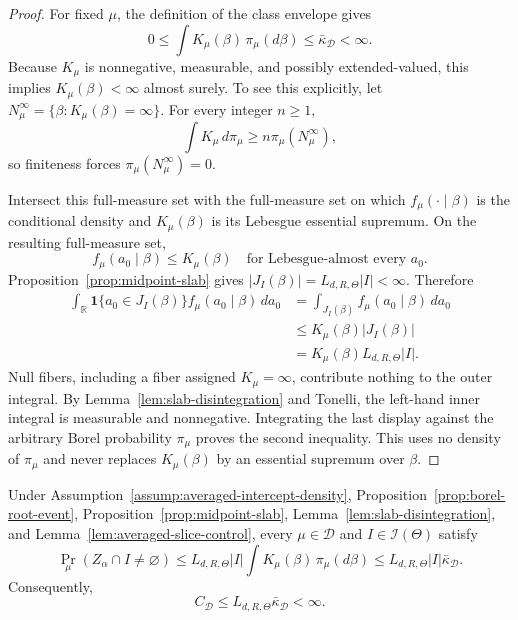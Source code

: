 \begin{proof}
For fixed $\mu$, the definition of the class envelope gives
\[
0\leq\int K_\mu(\beta)\,\pi_\mu(d\beta)
\leq\bar\kappa_{\mathcal D}<\infty.
\]
Because $K_\mu$ is nonnegative, measurable, and possibly
extended-valued, this implies $K_\mu(\beta)<\infty$ almost surely.  To
see this explicitly, let
$N_\mu^\infty=\{\beta:K_\mu(\beta)=\infty\}$.  For every integer
$n\geq1$,
\[
\int K_\mu\,d\pi_\mu\geq n\pi_\mu(N_\mu^\infty),
\]
so finiteness forces $\pi_\mu(N_\mu^\infty)=0$.

Intersect this full-measure set with the full-measure set on which
$f_\mu(\cdot\mid\beta)$ is the conditional density and $K_\mu(\beta)$
is its Lebesgue essential supremum.  On the resulting full-measure set,
\[
f_\mu(a_0\mid\beta)\leq K_\mu(\beta)
\quad\text{for Lebesgue-almost every }a_0.
\]
Proposition~\ref{prop:midpoint-slab} gives
$|J_I(\beta)|=L_{d,R,\Theta}|I|<\infty$.  Therefore
\[
\begin{aligned}
\int_{\mathbb R}\mathbf1\{a_0\in J_I(\beta)\}
f_\mu(a_0\mid\beta)\,da_0
&=\int_{J_I(\beta)}f_\mu(a_0\mid\beta)\,da_0\\
&\leq K_\mu(\beta)|J_I(\beta)|\\
&=K_\mu(\beta)L_{d,R,\Theta}|I|.
\end{aligned}
\]
Null fibers, including a fiber assigned $K_\mu=\infty$, contribute
nothing to the outer integral.  By Lemma~\ref{lem:slab-disintegration}
and Tonelli, the left-hand inner integral is measurable and nonnegative.
Integrating the last display against the arbitrary Borel probability
$\pi_\mu$ proves the second inequality.  This uses no density of
$\pi_\mu$ and never replaces $K_\mu(\beta)$ by an essential supremum
over $\beta$.
\end{proof}

\begin{proposition}
\label{prop:averaged-root-hitting}
Under Assumption~\ref{assump:averaged-intercept-density},
Proposition~\ref{prop:borel-root-event},
Proposition~\ref{prop:midpoint-slab},
Lemma~\ref{lem:slab-disintegration}, and
Lemma~\ref{lem:averaged-slice-control}, every
$\mu\in\mathcal D$ and $I\in\mathscr I(\Theta)$ satisfy
\[
\Pr_\mu(Z_\alpha\cap I\neq\varnothing)
\leq L_{d,R,\Theta}|I|
\int K_\mu(\beta)\,\pi_\mu(d\beta)
\leq L_{d,R,\Theta}|I|\bar\kappa_{\mathcal D}.
\]
Consequently,
\[
C_{\mathcal D}
\leq L_{d,R,\Theta}\bar\kappa_{\mathcal D}<\infty.
\]
\end{proposition}

